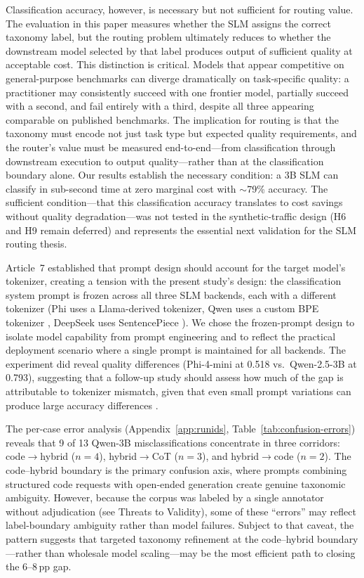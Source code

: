 \documentclass{article}
\begin{document}
Classification accuracy, however, is necessary but not sufficient for routing value. The evaluation in this paper measures whether the SLM assigns the correct taxonomy label, but the routing problem ultimately reduces to whether the downstream model selected by that label produces output of sufficient quality at acceptable cost. This distinction is critical. Models that appear competitive on general-purpose benchmarks can diverge dramatically on task-specific quality: a practitioner may consistently succeed with one frontier model, partially succeed with a second, and fail entirely with a third, despite all three appearing comparable on published benchmarks. The implication for routing is that the taxonomy must encode not just task type but expected quality requirements, and the router's value must be measured end-to-end---from classification through downstream execution to output quality---rather than at the classification boundary alone. Our results establish the necessary condition: a 3B SLM can classify in sub-second time at zero marginal cost with $\sim$79\% accuracy. The sufficient condition---that this classification accuracy translates to cost savings without quality degradation---was not tested in the synthetic-traffic design (H6 and H9 remain deferred) and represents the essential next validation for the SLM routing thesis.

Article~7 \citep{johnson2026promptlang} established that prompt design should account for the target model's tokenizer, creating a tension with the present study's design: the classification system prompt is frozen across all three SLM backends, each with a different tokenizer (Phi uses a Llama-derived tokenizer, Qwen uses a custom BPE tokenizer \citep{sennrich2016subword}, DeepSeek uses SentencePiece \citep{kudo2018sentencepiece}). We chose the frozen-prompt design to isolate model capability from prompt engineering and to reflect the practical deployment scenario where a single prompt is maintained for all backends. The experiment did reveal quality differences (Phi-4-mini at 0.518 vs.\ Qwen-2.5-3B at 0.793), suggesting that a follow-up study should assess how much of the gap is attributable to tokenizer mismatch, given that even small prompt variations can produce large accuracy differences \citep{zhou2023prompt,khattab2024dspy}.

The per-case error analysis (Appendix~\ref{app:runids}, Table~\ref{tab:confusion-errors}) reveals that 9 of 13 Qwen-3B misclassifications concentrate in three corridors: code$\to$hybrid ($n = 4$), hybrid$\to$CoT ($n = 3$), and hybrid$\to$code ($n = 2$). The code--hybrid boundary is the primary confusion axis, where prompts combining structured code requests with open-ended generation create genuine taxonomic ambiguity. However, because the corpus was labeled by a single annotator without adjudication (see Threats to Validity), some of these ``errors'' may reflect label-boundary ambiguity rather than model failures. Subject to that caveat, the pattern suggests that targeted taxonomy refinement at the code--hybrid boundary---rather than wholesale model scaling---may be the most efficient path to closing the 6--8\,pp gap.
\end{document}
